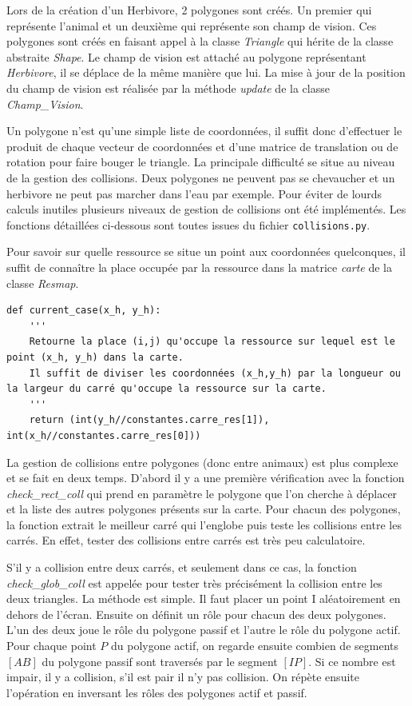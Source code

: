 \documentclass[a4paper,11pt,final,oneside]{article}
\begin{document}
Lors de la création d'un Herbivore, 2 polygones sont créés. Un premier qui représente l'animal et un deuxième qui représente son champ de vision. Ces polygones sont créés en faisant appel à la classe \textit{Triangle} qui  hérite de la classe abstraite \textit{Shape}. Le champ de vision est attaché au polygone représentant \textit{Herbivore}, il se déplace de la même manière que lui. La mise à jour de la position du champ de vision est réalisée par la méthode \textit{update} de la classe \textit{Champ\_Vision}. 

Un polygone n'est qu'une simple liste de coordonnées, il suffit donc d'effectuer le produit de chaque vecteur de coordonnées et d'une matrice de translation ou de rotation pour faire bouger le triangle. La principale difficulté se situe au niveau de la gestion des collisions. Deux polygones ne peuvent pas se chevaucher et un herbivore ne peut pas marcher dans l'eau par exemple. Pour éviter de lourds calculs inutiles plusieurs niveaux de gestion de collisions ont été implémentés. Les fonctions détaillées ci-dessous sont toutes issues du fichier \texttt{collisions.py}.


Pour savoir sur quelle ressource se situe un point aux coordonnées quelconques, il suffit de connaître la place occupée par la ressource dans la matrice \textit{carte} de la classe \textit{Resmap}. \\

\begin{lstlisting}
def current_case(x_h, y_h):
	'''
	Retourne la place (i,j) qu'occupe la ressource sur lequel est le point (x_h, y_h) dans la carte.
	Il suffit de diviser les coordonnées (x_h,y_h) par la longueur ou la largeur du carré qu'occupe la ressource sur la carte.
	''' 
    return (int(y_h//constantes.carre_res[1]), int(x_h//constantes.carre_res[0]))
\end{lstlisting}

La gestion de collisions entre polygones (donc entre animaux) est plus complexe et se fait en deux temps. D'abord il y a une première vérification avec la fonction \textit{check\_rect\_coll} qui prend en paramètre le polygone que l'on cherche à déplacer et la liste des autres polygones présents sur la carte. Pour chacun des polygones, la fonction extrait le meilleur carré qui l'englobe puis teste les collisions entre les carrés. En effet, tester des collisions entre carrés est très peu calculatoire.

S'il y a collision entre deux carrés, et seulement dans ce cas, la fonction \\ \textit{{check\_glob\_coll}} est appelée pour tester très précisément la collision entre les deux triangles. La méthode est simple. Il faut placer un point I aléatoirement en dehors de l'écran. Ensuite on définit un rôle pour chacun des deux polygones. L'un des deux joue le rôle du polygone passif et l'autre le rôle du polygone actif. Pour chaque point $P$ du polygone actif, on regarde ensuite combien de segments $[AB]$ du polygone passif sont traversés par le segment $[IP]$. Si ce nombre est impair, il y a collision, s'il est pair il n'y pas collision. On répète ensuite l'opération en inversant les rôles des polygones actif et passif. 
\end{document}
